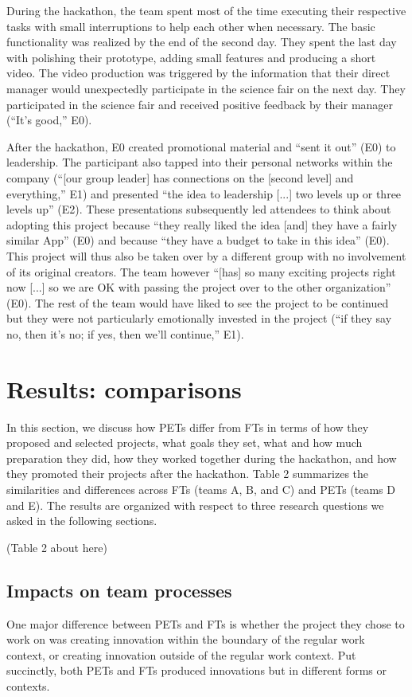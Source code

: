 \documentclass{hcij}
\begin{document}
During the hackathon, the team spent most of the time executing their respective tasks with small interruptions to help each other when necessary. The basic functionality was realized by the end of the second day. They spent the last day with polishing their prototype, adding small features and producing a short video. The video production was triggered by the information that their direct manager would unexpectedly participate in the science fair on the next day. They participated in the science fair and received positive feedback by their manager (“It’s good,” E0).

After the hackathon, E0 created promotional material and “sent it out” (E0) to leadership. The participant also tapped into their personal networks within the company (“[our group leader] has connections on the [second level] and everything,” E1) and presented “the idea to leadership [...] two levels up or three levels up” (E2). These presentations subsequently led attendees to think about adopting this project because “they really liked the idea [and] they have a fairly similar App” (E0) and because “they have a budget to take in this idea” (E0). This project will thus also be taken over by a different group with no involvement of its original creators. The team however “[has] so many exciting projects right now [...] so we are OK with passing the project over to the other organization” (E0). The rest of the team would have liked to see the project to be continued but they were not particularly emotionally invested in the project (“if they say no, then it’s no; if yes, then we’ll continue,” E1).

\section{Results: comparisons}
In this section, we discuss how PETs differ from FTs in terms of how they proposed and selected projects, what goals they set, what and how much preparation they did, how they worked together during the hackathon, and how they promoted their projects after the hackathon. Table 2 summarizes the similarities and differences across FTs (teams A, B, and C) and PETs (teams D and E). The results are organized with respect to three research questions we asked in the following sections.

(Table 2 about here)

\subsection{Impacts on team processes}
One major difference between PETs and FTs is whether the project they chose to work on was creating innovation within the boundary of the regular work context, or creating innovation outside of the regular work context. Put succinctly, both PETs and FTs produced innovations but in different forms or contexts.
\end{document}
